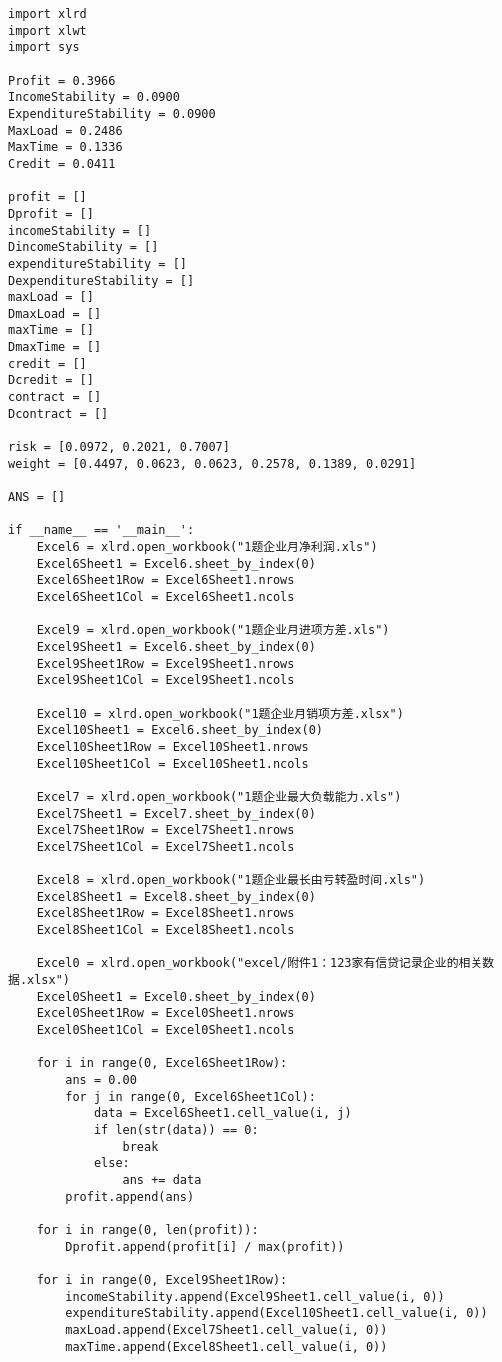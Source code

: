 \documentclass[dvipsnames,withoutpreface,bwprint]{cumcmthesis}
\begin{document}
\begin{appendices}
\begin{lstlisting}
import xlrd
import xlwt
import sys

Profit = 0.3966
IncomeStability = 0.0900
ExpenditureStability = 0.0900
MaxLoad = 0.2486
MaxTime = 0.1336
Credit = 0.0411

profit = []
Dprofit = []
incomeStability = []
DincomeStability = []
expenditureStability = []
DexpenditureStability = []
maxLoad = []
DmaxLoad = []
maxTime = []
DmaxTime = []
credit = []
Dcredit = []
contract = []
Dcontract = []

risk = [0.0972, 0.2021, 0.7007]
weight = [0.4497, 0.0623, 0.0623, 0.2578, 0.1389, 0.0291]

ANS = []

if __name__ == '__main__':
    Excel6 = xlrd.open_workbook("1题企业月净利润.xls")
    Excel6Sheet1 = Excel6.sheet_by_index(0)
    Excel6Sheet1Row = Excel6Sheet1.nrows
    Excel6Sheet1Col = Excel6Sheet1.ncols

    Excel9 = xlrd.open_workbook("1题企业月进项方差.xls")
    Excel9Sheet1 = Excel6.sheet_by_index(0)
    Excel9Sheet1Row = Excel9Sheet1.nrows
    Excel9Sheet1Col = Excel9Sheet1.ncols

    Excel10 = xlrd.open_workbook("1题企业月销项方差.xlsx")
    Excel10Sheet1 = Excel6.sheet_by_index(0)
    Excel10Sheet1Row = Excel10Sheet1.nrows
    Excel10Sheet1Col = Excel10Sheet1.ncols

    Excel7 = xlrd.open_workbook("1题企业最大负载能力.xls")
    Excel7Sheet1 = Excel7.sheet_by_index(0)
    Excel7Sheet1Row = Excel7Sheet1.nrows
    Excel7Sheet1Col = Excel7Sheet1.ncols

    Excel8 = xlrd.open_workbook("1题企业最长由亏转盈时间.xls")
    Excel8Sheet1 = Excel8.sheet_by_index(0)
    Excel8Sheet1Row = Excel8Sheet1.nrows
    Excel8Sheet1Col = Excel8Sheet1.ncols

    Excel0 = xlrd.open_workbook("excel/附件1：123家有信贷记录企业的相关数据.xlsx")
    Excel0Sheet1 = Excel0.sheet_by_index(0)
    Excel0Sheet1Row = Excel0Sheet1.nrows
    Excel0Sheet1Col = Excel0Sheet1.ncols

    for i in range(0, Excel6Sheet1Row):
        ans = 0.00
        for j in range(0, Excel6Sheet1Col):
            data = Excel6Sheet1.cell_value(i, j)
            if len(str(data)) == 0:
                break
            else:
                ans += data
        profit.append(ans)

    for i in range(0, len(profit)):
        Dprofit.append(profit[i] / max(profit))

    for i in range(0, Excel9Sheet1Row):
        incomeStability.append(Excel9Sheet1.cell_value(i, 0))
        expenditureStability.append(Excel10Sheet1.cell_value(i, 0))
        maxLoad.append(Excel7Sheet1.cell_value(i, 0))
        maxTime.append(Excel8Sheet1.cell_value(i, 0))


\end{lstlisting}
\end{appendices}
\end{document}
